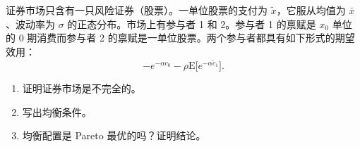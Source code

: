 \par\noindent\begin{minipage}{\linewidth}
\begin{problem}
 证券市场只含有一只风险证券（股票）。一单位股票的支付为 $\tilde{x}$，它服从均值为 $\bar{x}$、波动率为 $\sigma$ 的正态分布。市场上有参与者 1 和 2。参与者 1 的禀赋是 $x_{0}$ 单位的 0 期消费而参与者 2 的禀赋是一单位股票。两个参与者都具有如下形式的期望效用：
\[
    -e^{-\alpha c_{0}}-\rho\mathrm{E}\bigl[e^{-\alpha\tilde{c}_{1}}\bigr].
\]
\begin{enumerate}[label=(\alph*)]
    \item 证明证券市场是不完全的。
    \item 写出均衡条件。
    \item 均衡配置是 Pareto 最优的吗？证明结论。
\end{enumerate}
\end{problem}
\end{minipage}\par
{}
